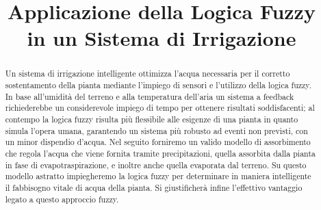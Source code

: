 \documentclass[conference,10pt]{IEEEtran}
\begin{document}
\title{Applicazione della Logica Fuzzy\\ in un Sistema di Irrigazione}

\author{
}

\maketitle

\begin{abstract}
Un sistema di irrigazione intelligente ottimizza l'acqua necessaria per il corretto sostentamento della pianta mediante l'impiego di sensori e l'utilizzo della logica fuzzy.
In base all'umidità del terreno e alla temperatura dell'aria un sistema a feedback richiederebbe un considerevole impiego di tempo per ottenere risultati soddisfacenti; al contempo la logica fuzzy risulta più flessibile alle esigenze di una pianta in quanto simula l'opera umana, garantendo un sistema più robusto ad eventi non previsti, con un minor dispendio d'acqua. Nel seguito forniremo un valido modello di assorbimento che regola  l'acqua che viene fornita tramite precipitazioni, quella assorbita dalla pianta in fase di evapotraspirazione, e inoltre anche quella evaporata dal terreno. Su questo modello astratto impiegheremo la logica fuzzy per determinare in maniera intelligente il fabbisogno vitale di acqua della pianta. Si giustificherà infine l'effettivo vantaggio legato a questo approccio fuzzy.
\end{abstract}

\end{document}
